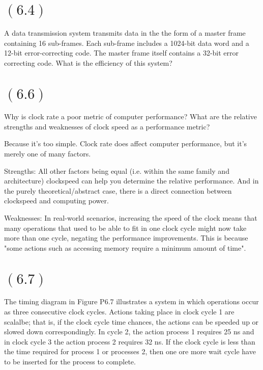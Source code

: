 \documentclass[letterpaper,12pt,titlepage]{article}
\begin{document}
\section*{$(6.4)$} A data transmission system transmits data in the the form of a master frame containing 16 sub-frames. Each sub-frame includes a 1024-bit data word and a 12-bit error-correcting code. The master frame itself contains a 32-bit error correcting code. What is the efficiency of this system?

\begin{mdframed}[style=MyFrame]
\end{mdframed}

\section*{$(6.6)$} Why is clock rate a poor metric of computer performance? What are the relative strengths and weaknesses of clock speed as a performance metric?

\begin{mdframed}[style=MyFrame]
    Because it's too simple. Clock rate does affect computer performance, but it's merely one of many factors.

    Strengths: All other factors being equal (i.e. within the same family and architecture) clockspeed can help you determine the relative performance. And in the purely theoretical/abstract case, there is a direct connection between clockspeed and computing power.

    Weaknesses: In real-world scenarios, increasing the speed of the clock means that many operations that used to be able to fit in one clock cycle might now take more than one cycle, negating the performance improvements. This is because "some actions such as accessing memory require a minimum amount of time".
    \cite{Clements}
\end{mdframed}

\section*{$(6.7)$} The timing diagram in Figure P6.7 illustrates a system in which operations occur as three consecutive clock cycles. Actions taking place in clock cycle 1 are scalalbe; that is, if the clock cycle time chances, the actions can be speeded up or slowed down correspondingly. In cycle 2, the action process 1 requires 25 ns and in clock cycle 3 the action process 2 requires 32 ns. If the clock cycle is less than the time required for process 1 or processes 2, then one ore more wait cycle have to be inserted for the process to complete.
\end{document}
